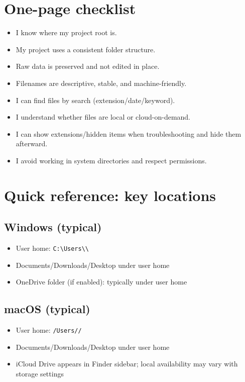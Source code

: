 \section{One-page checklist}
\begin{itemize}
\item I know where my project root is.
\item My project uses a consistent folder structure.
\item Raw data is preserved and not edited in place.
\item Filenames are descriptive, stable, and machine-friendly.
\item I can find files by search (extension/date/keyword).
\item I understand whether files are local or cloud-on-demand.
\item I can show extensions/hidden items when troubleshooting and hide them afterward.
\item I avoid working in system directories and respect permissions.
\end{itemize}

\section{Quick reference: key locations}
\subsection{Windows (typical)}
\begin{itemize}
\item User home: \texttt{C:\textbackslash Users\textbackslash \textbackslash}
\item Documents/Downloads/Desktop under user home
\item OneDrive folder (if enabled): typically under user home
\end{itemize}

\subsection{macOS (typical)}
\begin{itemize}
\item User home: \texttt{/Users//}
\item Documents/Downloads/Desktop under user home
\item iCloud Drive appears in Finder sidebar; local availability may vary with storage settings
\end{itemize}

